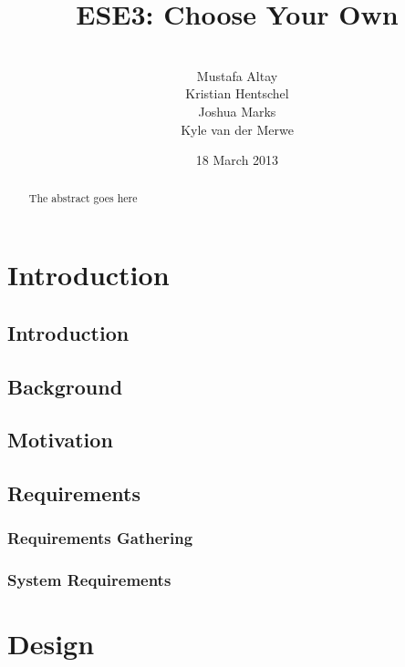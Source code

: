 \documentclass{l3proj}
\begin{document}
\title{ESE3: Choose Your Own}
\author{ \\
        Mustafa Altay\\
        Kristian Hentschel \\
        Joshua Marks \\
        Kyle van der Merwe}
\date{18 March 2013}
\maketitle
\begin{abstract}

The abstract goes here

\end{abstract}
\educationalconsent
\tableofcontents
\chapter{Introduction}
\label{intro}
\section{Introduction}

\section{Background}

\section{Motivation}

\section{Requirements}
\label{requirements}

\subsection{Requirements Gathering}
\label{gathering}

\subsection{System Requirements}
\label{system}

\chapter{Design}
\label{design}
\end{document}
